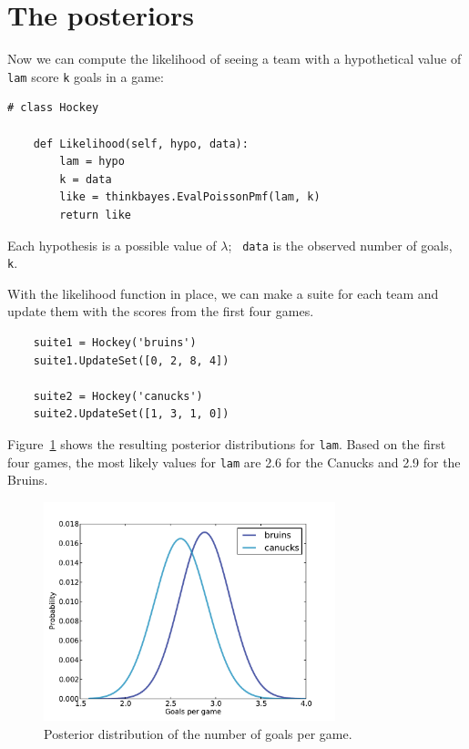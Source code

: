 \documentclass[12pt]{book}
\begin{document}
\section{The posteriors}

Now we can compute the likelihood of seeing a team with a hypothetical
value of {\tt lam} score {\tt k} goals in a game:

\begin{verbatim}
# class Hockey

    def Likelihood(self, hypo, data):
        lam = hypo
        k = data
        like = thinkbayes.EvalPoissonPmf(lam, k)
        return like
\end{verbatim}

Each hypothesis is a possible value of $\lambda$;  {\tt
  data} is the observed number of goals, {\tt k}.

With the likelihood function in place, we can make a suite for each
team and update them with the scores from the first four games.

\begin{verbatim}
    suite1 = Hockey('bruins')
    suite1.UpdateSet([0, 2, 8, 4])
     
    suite2 = Hockey('canucks')
    suite2.UpdateSet([1, 3, 1, 0])
\end{verbatim}  

Figure~\ref{fig.hockey1} shows the resulting posterior distributions
for {\tt lam}.  Based on the first four games, the most likely
values for {\tt lam} are 2.6 for the Canucks and 2.9 for the Bruins.

\begin{figure}
\centerline{\includegraphics[height=2.5in]{figs/hockey1.pdf}}
\caption{Posterior distribution of the number of
goals per game.}
\label{fig.hockey1}
\end{figure}
\end{document}
